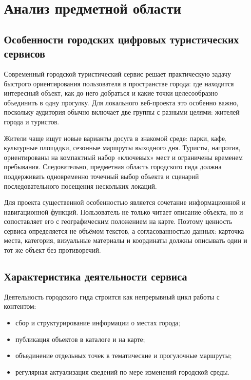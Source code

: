 \section{Анализ предметной области}

\subsection{Особенности городских цифровых туристических сервисов}

Современный городской туристический сервис решает практическую задачу быстрого ориентирования пользователя в пространстве города: где находится интересный объект, как до него добраться и какие точки целесообразно объединить в одну прогулку. Для локального веб-проекта это особенно важно, поскольку аудитория обычно включает две группы с разными целями: жителей города и туристов.

Жители чаще ищут новые варианты досуга в знакомой среде: парки, кафе, культурные площадки, сезонные маршруты выходного дня. Туристы, напротив, ориентированы на компактный набор «ключевых» мест и ограничены временем пребывания. Следовательно, предметная область городского гида должна поддерживать одновременно точечный выбор объекта и сценарий последовательного посещения нескольких локаций.

Для проекта существенной особенностью является сочетание информационной и навигационной функций. Пользователь не только читает описание объекта, но и сопоставляет его с географическим положением на карте. Поэтому ценность сервиса определяется не объёмом текстов, а согласованностью данных: карточка места, категория, визуальные материалы и координаты должны описывать один и тот же объект без противоречий.

\subsection{Характеристика деятельности сервиса}

Деятельность городского гида строится как непрерывный цикл работы с контентом:
\begin{itemize}
	\item сбор и структурирование информации о местах города;
	\item публикация объектов в каталоге и на карте;
	\item объединение отдельных точек в тематические и прогулочные маршруты;
	\item регулярная актуализация сведений по мере изменений городской среды.
\end{itemize}

